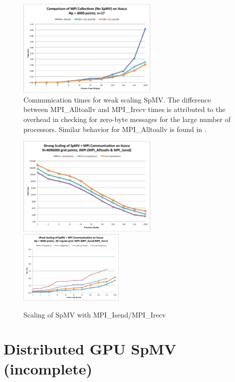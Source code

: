\documentclass{report}
\begin{document}
\begin{figure}
\centering
\includegraphics[width=0.6\textwidth]{performance_content/scaling/weak_scaling_np4000_regular_n17_compare_commOnly.png}
\caption{Communication times for weak scaling SpMV. The difference between MPI\_Alltoallv and MPI\_Irecv times is attributed to the overhead in checking for zero-byte messages for the large number of processors. Similar behavior for MPI\_Alltoallv is found in \cite{Balaji2010}.}
\end{figure}

\begin{figure}
\centering
\includegraphics[width=0.6\textwidth]{performance_content/scaling/strong_scaling_4M_regular_isend.png}  
\includegraphics[width=0.45\textwidth]{performance_content/scaling/weak_scaling_np4000_regular_isend.png}  
\caption{Scaling of SpMV with MPI\_Isend/MPI\_Irecv}
\end{figure}


\chapter{Distributed GPU SpMV (incomplete)}
\label{chap:multigpu_rbffd}
\end{document}
